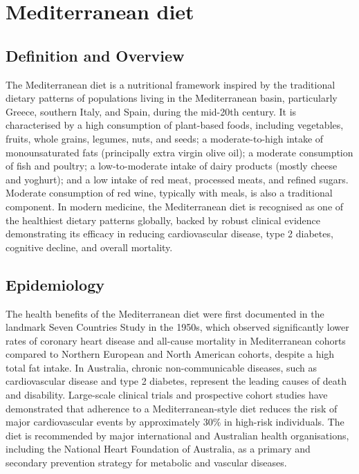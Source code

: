 \chapter{Mediterranean diet}

\section*{Definition and Overview}
The Mediterranean diet is a nutritional framework inspired by the traditional dietary patterns of populations living in the Mediterranean basin, particularly Greece, southern Italy, and Spain, during the mid-20th century. It is characterised by a high consumption of plant-based foods, including vegetables, fruits, whole grains, legumes, nuts, and seeds; a moderate-to-high intake of monounsaturated fats (principally extra virgin olive oil); a moderate consumption of fish and poultry; a low-to-moderate intake of dairy products (mostly cheese and yoghurt); and a low intake of red meat, processed meats, and refined sugars. Moderate consumption of red wine, typically with meals, is also a traditional component. In modern medicine, the Mediterranean diet is recognised as one of the healthiest dietary patterns globally, backed by robust clinical evidence demonstrating its efficacy in reducing cardiovascular disease, type 2 diabetes, cognitive decline, and overall mortality.

\section*{Epidemiology}
The health benefits of the Mediterranean diet were first documented in the landmark Seven Countries Study in the 1950s, which observed significantly lower rates of coronary heart disease and all-cause mortality in Mediterranean cohorts compared to Northern European and North American cohorts, despite a high total fat intake. In Australia, chronic non-communicable diseases, such as cardiovascular disease and type 2 diabetes, represent the leading causes of death and disability. Large-scale clinical trials and prospective cohort studies have demonstrated that adherence to a Mediterranean-style diet reduces the risk of major cardiovascular events by approximately 30\% in high-risk individuals. The diet is recommended by major international and Australian health organisations, including the National Heart Foundation of Australia, as a primary and secondary prevention strategy for metabolic and vascular diseases.

